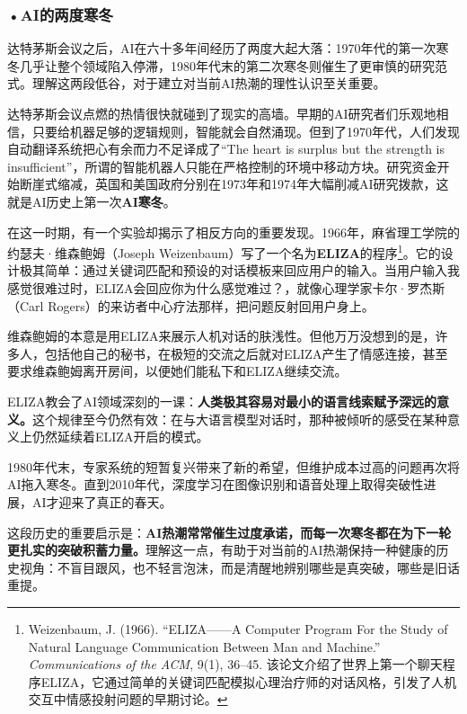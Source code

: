 \subsubsection*{\textbf{•AI的两度寒冬}}

达特茅斯会议之后，AI在六十多年间经历了两度大起大落：1970年代的第一次寒冬几乎让整个领域陷入停滞，1980年代末的第二次寒冬则催生了更审慎的研究范式。理解这两段低谷，对于建立对当前AI热潮的理性认识至关重要。

达特茅斯会议点燃的热情很快就碰到了现实的高墙。早期的AI研究者们乐观地相信，只要给机器足够的逻辑规则，智能就会自然涌现。但到了1970年代，人们发现自动翻译系统把心有余而力不足译成了``The heart is surplus but the strength is insufficient''，所谓的智能机器人只能在严格控制的环境中移动方块。研究资金开始断崖式缩减，英国和美国政府分别在1973年和1974年大幅削减AI研究拨款，这就是AI历史上第一次\textbf{AI寒冬}。

在这一时期，有一个实验却揭示了相反方向的重要发现。1966年，麻省理工学院的约瑟夫·维森鲍姆（Joseph Weizenbaum）写了一个名为\textbf{ELIZA}的程序\footnote{Weizenbaum, J. (1966). ``ELIZA——A Computer Program For the Study of Natural Language Communication Between Man and Machine.'' \emph{Communications of the ACM}, 9(1), 36--45. 该论文介绍了世界上第一个聊天程序ELIZA，它通过简单的关键词匹配模拟心理治疗师的对话风格，引发了人机交互中情感投射问题的早期讨论。}。它的设计极其简单：通过关键词匹配和预设的对话模板来回应用户的输入。当用户输入我感觉很难过时，ELIZA会回应你为什么感觉难过？，就像心理学家卡尔·罗杰斯（Carl Rogers）的来访者中心疗法那样，把问题反射回用户身上。

维森鲍姆的本意是用ELIZA来展示人机对话的肤浅性。但他万万没想到的是，许多人，包括他自己的秘书，在极短的交流之后就对ELIZA产生了情感连接，甚至要求维森鲍姆离开房间，以便她们能私下和ELIZA继续交流。

ELIZA教会了AI领域深刻的一课：\textbf{人类极其容易对最小的语言线索赋予深远的意义。}这个规律至今仍然有效：在与大语言模型对话时，那种被倾听的感受在某种意义上仍然延续着ELIZA开启的模式。

1980年代末，专家系统的短暂复兴带来了新的希望，但维护成本过高的问题再次将AI拖入寒冬。直到2010年代，深度学习在图像识别和语音处理上取得突破性进展，AI才迎来了真正的春天。

这段历史的重要启示是：\textbf{AI热潮常常催生过度承诺，而每一次寒冬都在为下一轮更扎实的突破积蓄力量。}理解这一点，有助于对当前的AI热潮保持一种健康的历史视角：不盲目跟风，也不轻言泡沫，而是清醒地辨别哪些是真突破，哪些是旧话重提。

